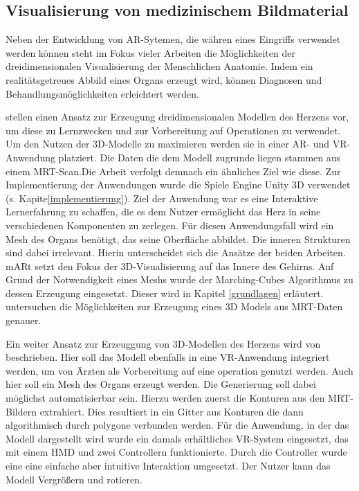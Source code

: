 \subsection{Visualisierung von medizinischem Bildmaterial}

Neben der Entwicklung von AR-Sytemen, die währen eines Eingriffs verwendet werden können steht im Fokus vieler Arbeiten die Möglichkeiten der dreidimensionalen Visualisierung der Menschlichen Anatomie. Indem ein realitätsgetreues Abbild eines Organs erzeugt wird, können Diagnosen und Behandlungsmöglichkeiten erleichtert werden.

\citet{Mangina17} stellen einen Ansatz zur Erzeugung dreidimensionalen Modellen des Herzens vor, um diese zu Lernzwecken und zur Vorbereitung auf Operationen zu verwendet. Um den Nutzen der 3D-Modelle zu maximieren werden sie in einer AR- und VR-Anwendung platziert. Die Daten die dem Modell zugrunde liegen stammen aus einem MRT-Scan.Die Arbeit verfolgt demnach ein ähnliches Ziel wie diese. 
Zur Implementierung der Anwendungen wurde die Spiele Engine Unity 3D verwendet (s. Kapite\ref{implementierung}).
Ziel der Anwendung war es eine Interaktive Lernerfahrung zu schaffen, die es dem Nutzer ermöglicht das Herz in seine verschiedenen Komponenten zu zerlegen. Für diesen Anwendungsfall wird ein Mesh des Organs benötigt, das seine Oberfläche abbildet. Die inneren Strukturen sind dabei irrelevant. Hierin unterscheidet sich  die Ansätze der beiden Arbeiten. mARt setzt den Fokus der 3D-Visualisierung auf das Innere des Gehirns.
Auf Grund der Notwendigkeit eines Meshs wurde der Marching-Cubes Algorithmus zu dessen Erzeugung eingesetzt. Dieser wird in Kapitel \ref{grundlagen} erläutert.
\citet{Mangina17_2} untersuchen die Möglichkeiten zur Erzeugung eines 3D Models aus MRT-Daten genauer.

Ein weiter Ansatz zur Erzeuggung von 3D-Modellen des Herzens wird von \citet{SORENSEN2001193} beschrieben. Hier soll das Modell ebenfalls in eine VR-Anwendung integriert werden, um von Ärzten als Vorbereitung auf eine operation genutzt werden. 
Auch hier soll ein Mesh des Organs erzeugt werden. Die Generierung soll dabei möglichst automatisierbar sein.  Hierzu werden zuerst die Konturen aus den MRT-Bildern extrahiert. Dies resultiert in ein Gitter aus Konturen die dann algorithmisch durch polygone verbunden werden. 
Für die Anwendung, in der das Modell dargestellt wird wurde ein damals erhältliches VR-System eingesetzt, das mit einem HMD und zwei Controllern funktionierte. 
Durch die Controller wurde eine eine einfache aber intuitive Interaktion umgesetzt. Der Nutzer kann das Modell Vergrößern und rotieren.  

